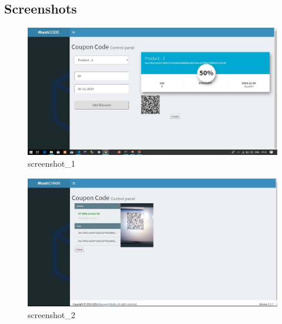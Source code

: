 \subsection{Screenshots}
\begin{figure}[H]
    \includegraphics[scale=0.47]{screenshot_1}
    \caption{screenshot_1}
\end{figure}
\vspace{1cm}
\begin{figure}[H]
    \includegraphics[scale=0.47]{screenshot_2}
    \caption{screenshot_2}
\end{figure}

\newpage



